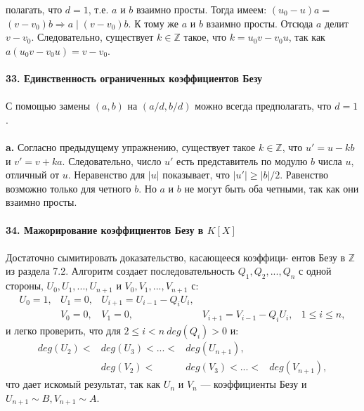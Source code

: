 полагать, что $d = 1$, т.е. $a$ и $b$ взаимно просты. Тогда имеем: $(u_0 - u)a =$ \linebreak
$(v - v_0)b \Rightarrow a \mid (v - v_0)b$. К тому же $a$ и $b$  взаимно просты. Отсюда $a$\linebreak
делит $v - v_0$. Следовательно, существует $k \in \mathbb{Z}$ такое, что $k = u_0v - v_0u$,\linebreak
так как $a(u_0v - v_0u) = v - v_0$.\\
\\
\noindent\textbf{33. Единственность ограниченных коэффициентов Безу}\\
\\
\hspace*{15pt}С помощью замены $(a, b)$ на $(a/d, b/d)$  можно всегда предполагать,\linebreak
что $d = 1$.\\
\\
\hspace*{15pt}\textbf{a.} Согласно предыдущему упражнению, существует такое $k \in \mathbb{Z}$,\linebreak
что $u' = u - kb$ и $v' = v+ka$. Следовательно, число $u'$ есть представитель\linebreak
по модулю $b$ числа $u$, отличный от $u$. Неравенство для $|u|$ показывает,\linebreak
что $|u'| \geqslant |b|/2$. Равенство возможно только для четного $b$. Но $a$ и $b$ не\linebreak
могут быть оба четными, так как они взаимно просты.\\
\\
\noindent\textbf{34. Мажорирование коэффициентов Безу в $K[X]$}\\
\\
\hspace*{15pt}Достаточно сымитировать доказательство, касающееся коэффици-­\linebreak
ентов Безу в $\mathbb{Z}$ из раздела 7.2. Алгоритм создает последовательность\linebreak
$Q_1, Q_2, ..., Q_n$  с одной стороны, $U_0, U_1, ..., U_{n+1}$ и $V_0, V_1, ..., V_{n+1}$ с:
		$$\begin{array}{ccccc}
			U_0 = 1,& U_1 = 0, & U_{i+1} = U_{i-1} - Q_iU_i, &                               & \\
								& V_0 = 0, & V_1 = 0,                    & V_{i+1} = V_{i-1} - Q_iU_i, & 1 \leqslant i \leqslant n,
		\end{array}$$
и легко проверить, что для  $2 \leqslant i < n~ deg(Q_i) > 0$ и:
		$$\begin{array}{cccc}
			deg(U_2) <  & deg(U_3) < ... < & deg(U_{n+1}),     & \\
							      & deg(V_2) <       & deg(V_3) < ... <  & deg(V_{n+1}),
		\end{array}$$
\noindent
что дает искомый результат, так как $U_n$ и $V_n$ ---  коэффициенты Безу\linebreak
и $U_{n+1} \sim B, V_{n+1} \sim A$.\\

